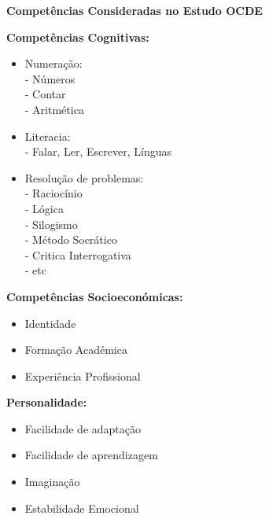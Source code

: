 \begin{center}\textbf{\large Competências Consideradas no Estudo OCDE} %
\end{center}
\begin{minipage}[t]{.5\linewidth}
\qquad \textbf{Competências Cognitivas:}
\begin{itemize}
\item Numeração:\\
- Números\\
- Contar\\
- Aritmética
\item Literacia:\\
- Falar, Ler, Escrever, Línguas
\item Resolução de problemas:\\
- Raciocínio\\
- Lógica\\
- Silogismo\\
- Método Socrático\\
- Critica Interrogativa\\
- etc
\end{itemize}
\qquad \textbf{Competências Socioeconómicas:}
\begin{itemize}
\setlength\itemsep{-.5em}
\item Identidade
\item Formação Académica
\item Experiência Profissional
\end{itemize}
\qquad \textbf{Personalidade:}
\begin{itemize}
\setlength\itemsep{-.5em}
\item Facilidade de adaptação
\item Facilidade de aprendizagem
\item Imaginação
\item Estabilidade Emocional
\end{itemize}
\end{minipage}
